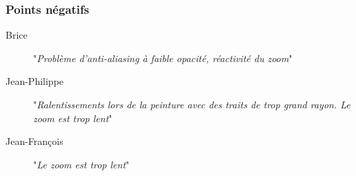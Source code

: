 		\subsubsection{Points négatifs}
			\begin{description}
				\item[Brice] "\emph{Problème d'anti-aliasing à faible opacité, réactivité du zoom}"
				\item[Jean-Philippe] "\emph{Ralentissements lors de la peinture avec des traits de trop grand rayon. Le zoom est trop lent}"
				\item[Jean-François] "\emph{Le zoom est trop lent}"
			\end{description}	
	\begin{figure}[h]
		\centering
		\\

\end{figure}
